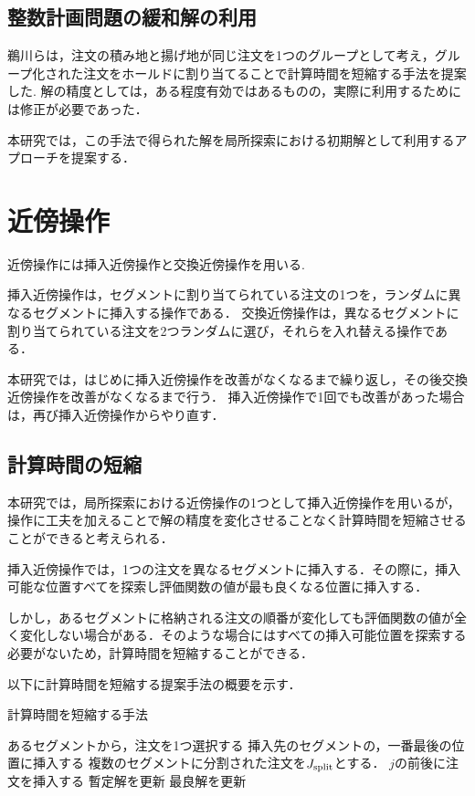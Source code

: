 \subsection{整数計画問題の緩和解の利用}
鵜川らは，注文の積み地と揚げ地が同じ注文を1つのグループとして考え，グループ化された注文をホールドに割り当てることで計算時間を短縮する手法を提案した\cite{ukawa}. 
解の精度としては，ある程度有効ではあるものの，実際に利用するためには修正が必要であった．

本研究では，この手法で得られた解を局所探索における初期解として利用するアプローチを提案する．


\section{近傍操作}
近傍操作には挿入近傍操作と交換近傍操作を用いる.

挿入近傍操作は，セグメントに割り当てられている注文の1つを，ランダムに異なるセグメントに挿入する操作である．
交換近傍操作は，異なるセグメントに割り当てられている注文を2つランダムに選び，それらを入れ替える操作である．

本研究では，はじめに挿入近傍操作を改善がなくなるまで繰り返し，その後交換近傍操作を改善がなくなるまで行う．
挿入近傍操作で1回でも改善があった場合は，再び挿入近傍操作からやり直す．


\subsection{計算時間の短縮}
\label{近傍操作の計算時間短縮}
本研究では，局所探索における近傍操作の1つとして挿入近傍操作を用いるが，操作に工夫を加えることで解の精度を変化させることなく計算時間を短縮させることができると考えられる．

挿入近傍操作では，1つの注文を異なるセグメントに挿入する．その際に，挿入可能な位置すべてを探索し評価関数の値が最も良くなる位置に挿入する．

しかし，あるセグメントに格納される注文の順番が変化しても評価関数の値が全く変化しない場合がある．そのような場合にはすべての挿入可能位置を探索する必要がないため，計算時間を短縮することができる．

以下に計算時間を短縮する提案手法の概要を示す．

\begin{algorithm}
 \caption{計算時間を短縮する手法}
 \label{algo1}
 \begin{algorithmic}[1]%
  \STATE あるセグメントから，注文を1つ選択する
  \STATE 挿入先のセグメントの，一番最後の位置に挿入する
  \STATE 複数のセグメントに分割された注文を$J_{\rm split}$とする．
  \STATE $j$の前後に注文を挿入する
  \STATE 暫定解を更新
  \ENDIF
  \ENDFOR
  \STATE 最良解を更新
  \ENDIF
 \end{algorithmic}
\end{algorithm}
